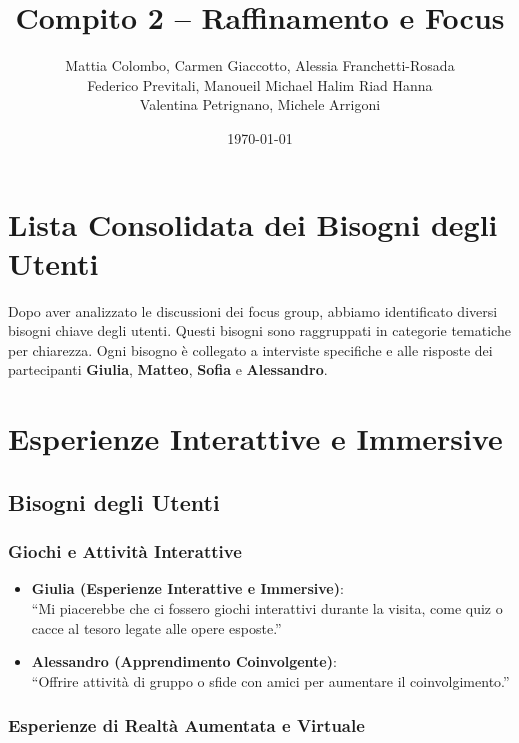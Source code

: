 \documentclass{article}
\title{Compito 2 – Raffinamento e Focus}
\author{Mattia Colombo, Carmen Giaccotto, Alessia Franchetti-Rosada \\Federico Previtali, Manoueil Michael Halim Riad Hanna \\ Valentina Petrignano, Michele Arrigoni}
\date{\today}
\begin{document}
\maketitle

\section*{Lista Consolidata dei Bisogni degli Utenti}

Dopo aver analizzato le discussioni dei focus group, abbiamo identificato diversi bisogni chiave degli utenti. Questi bisogni sono raggruppati in categorie tematiche per chiarezza. Ogni bisogno è collegato a interviste specifiche e alle risposte dei partecipanti \textbf{Giulia}, \textbf{Matteo}, \textbf{Sofia} e \textbf{Alessandro}.

\section{Esperienze Interattive e Immersive}

\subsection{Bisogni degli Utenti}

\subsubsection{Giochi e Attività Interattive}

\begin{itemize}
    \item \textbf{Giulia (Esperienze Interattive e Immersive)}:\\
    ``Mi piacerebbe che ci fossero giochi interattivi durante la visita, come quiz o cacce al tesoro legate alle opere esposte.''
    \item \textbf{Alessandro (Apprendimento Coinvolgente)}:\\
    ``Offrire attività di gruppo o sfide con amici per aumentare il coinvolgimento.''
\end{itemize}

\subsubsection{Esperienze di Realtà Aumentata e Virtuale}
\end{document}
